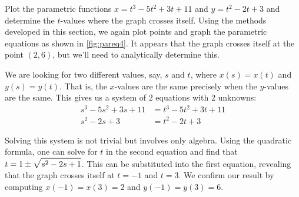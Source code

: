 \begin{example}\label{ex_pareq4}%
Plot the parametric functions $x=t^3-5t^2+3t+11$ and $y=t^2-2t+3$ and determine the $t$-values where the graph crosses itself.
\solution
Using the methods developed in this section, we again plot points and graph the parametric equations as shown in \autoref{fig:pareq4}. It appears that the graph crosses itself at the point $(2,6)$, but we'll need to analytically determine this.

We are looking for two different values, say, $s$ and $t$, where $x(s) = x(t)$ and $y(s) = y(t)$. That is, the $x$-values are the same precisely when the $y$-values are the same. This gives us a system of 2 equations with 2 unknowns:
%
%
\begin{align*}
s^3-5s^2+3s+11 &= t^3-5t^2+3t+11 \\
s^2-2s+3 &= t^2-2t+3
\end{align*}

Solving this system is not trivial but involves only algebra. Using the quadratic formula, one can solve for $t$ in the second equation and find that $\displaystyle t = 1\pm \sqrt{s^2-2s+1}$. This can be substituted into the first equation, revealing that the graph crosses itself at $t=-1$ and $t=3$. We confirm our result by computing $x(-1) = x(3)=2$ and $y(-1) = y(3) = 6$.
\end{example}

